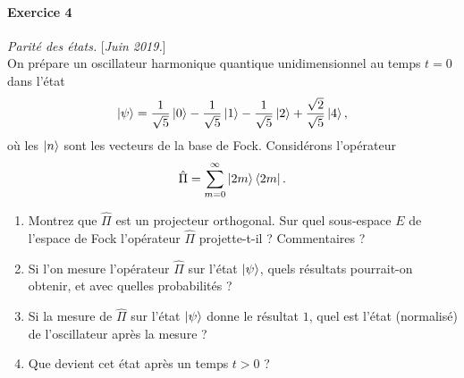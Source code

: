 \paragraph{Exercice 4} \textit{Parité des états.} \hfill [\textit{Juin 2019.}] \\
On prépare un oscillateur harmonique quantique unidimensionnel au temps $t=0$ dans l'état
\begin{equation}
\ket{\psi} = \frac{1}{\sqrt{5}} \ket{0} - \frac{1}{\sqrt{5}}\ket{1} - \frac{1}{\sqrt{5}}\ket{2} + \frac{\sqrt{2}}{\sqrt{5}}\ket{4},
\end{equation}
où les $\ket{n}$ sont les vecteurs de la base de Fock. Considérons l'opérateur
\begin{equation}
\hat \Pi = \sum_{m=0}^\infty \ket{2m}\bra{2m}.
\end{equation}
\begin{enumerate}
\item Montrez que $\hat \Pi$ est un projecteur orthogonal. Sur quel sous-espace $E$ de l'espace de Fock l'opérateur $\hat \Pi$ projette-t-il ? Commentaires ?
\item Si l'on mesure l'opérateur $\hat \Pi$ sur l'état $\ket{\psi}$, quels résultats pourrait-on obtenir, et avec quelles probabilités ?
\item Si la mesure de $\hat \Pi$ sur l'état $\ket{\psi}$ donne le résultat $1$, quel est l'état (normalisé) de l'oscillateur après la mesure ? 
\item Que devient cet état après un temps $t>0$ ?
\end{enumerate}


